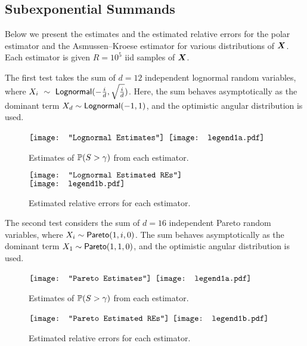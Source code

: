 \subsection{Subexponential Summands}

Below we present the estimates and the estimated relative errors for the polar estimator and the Asmussen--Kroese estimator for various distributions of $\bm{X}$. Each estimator is given $R = 10^5$ iid samples of $\bm{X}$.

The first test takes the sum of $d=12$ independent lognormal random variables, where $X_i~\sim~\mathsf{Lognormal}(-\frac{i}{d}, \sqrt{\frac{i}{d}})$. Here, the sum behaves asymptotically as the dominant term $X_d \sim \mathsf{Lognormal}(-1, 1)$, and the optimistic angular distribution is used.
\begin{figure}[H]
	\centering
	$\vcenter{\hbox{\texttt{[image: "Lognormal Estimates"]}}}$
 	\hspace*{.1in}
 	$\vcenter{\hbox{\texttt{[image: legend1a.pdf]}}}$
	\caption{Estimates of $\operatorname{{\mathbb P}}(S > \gamma)$ from each estimator.}
\end{figure}

\begin{figure}[H]
	\centering
	$\vcenter{\hbox{\texttt{[image: "Lognormal Estimated REs"]}}}$
 	\hspace*{.1in}
 	$\vcenter{\hbox{\texttt{[image: legend1b.pdf]}}}$
	\caption{Estimated relative errors for each estimator.}
\end{figure}

The second test considers the sum of $d=16$ independent Pareto random variables, where $X_i \sim \mathsf{Pareto}(1, i, 0)$. The sum behaves asymptotically as the dominant term $X_1 \sim \mathsf{Pareto}(1, 1, 0)$, and the optimistic angular distribution is used.
\begin{figure}[H]
	\centering
	$\vcenter{\hbox{\texttt{[image: "Pareto Estimates"]}}}$
 	\hspace*{.1in}
 	$\vcenter{\hbox{\texttt{[image: legend1a.pdf]}}}$
	\caption{Estimates of $\operatorname{{\mathbb P}}(S > \gamma)$ from each estimator.}
\end{figure}

\begin{figure}[H]
	\centering
	$\vcenter{\hbox{\texttt{[image: "Pareto Estimated REs"]}}}$
 	\hspace*{.1in}
 	$\vcenter{\hbox{\texttt{[image: legend1b.pdf]}}}$
	\caption{Estimated relative errors for each estimator.}
\end{figure}


